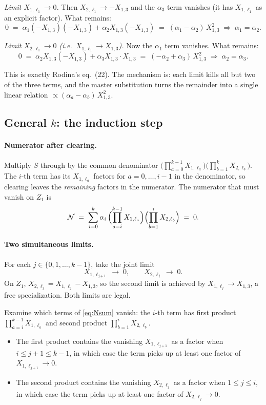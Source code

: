 \documentclass[11pt]{article}
\theoremstyle{definition}
\begin{document}
\smallskip
\noindent\emph{Limit $X_{1,\ell_1} \to 0$.} Then $X_{2,\ell_1} \to -X_{1,3}$ and the $\alpha_3$ term vanishes (it has $X_{1,\ell_1}$ as an explicit factor). What remains:
\[
0 \;=\; \alpha_1(-X_{1,3})(-X_{1,3}) + \alpha_2 X_{1,3}(-X_{1,3}) \;=\; (\alpha_1 - \alpha_2)\,X_{1,3}^2 \;\Longrightarrow\; \alpha_1 = \alpha_2.
\]

\smallskip
\noindent\emph{Limit $X_{2,\ell_1} \to 0$ (i.e.\ $X_{1,\ell_1} \to X_{1,3}$).} Now the $\alpha_1$ term vanishes. What remains:
\[
0 \;=\; \alpha_2 X_{1,3}(-X_{1,3}) + \alpha_3 X_{1,3}\cdot X_{1,3} \;=\; (-\alpha_2 + \alpha_3)\,X_{1,3}^2 \;\Longrightarrow\; \alpha_2 = \alpha_3.
\]

\noindent
This is exactly Rodina's eq.~(22). The mechanism is: each limit kills all but two of the three terms, and the master substitution turns the remainder into a single linear relation $\propto (\alpha_a - \alpha_b)\,X_{1,3}^2$.

\subsection{General $k$: the induction step}

\paragraph{Numerator after clearing.}
Multiply $S$ through by the common denominator $\bigl(\prod_{a=0}^{k-1} X_{1,\ell_a}\bigr)\bigl(\prod_{b=1}^{k} X_{2,\ell_b}\bigr)$. The $i$-th term has its $X_{1,\ell_a}$ factors for $a = 0, \dots, i-1$ in the denominator, so clearing leaves the \emph{remaining} factors in the numerator. The numerator that must vanish on $Z_1$ is
\begin{equation}\label{eq:Nsum}
\mathcal{N} \;=\; \sum_{i=0}^{k} \alpha_i \,\Bigl(\prod_{a=i}^{k-1} X_{1,\ell_a}\Bigr) \Bigl(\prod_{b=1}^{i} X_{2,\ell_b}\Bigr) \;=\; 0.
\end{equation}

\paragraph{Two simultaneous limits.}
For each $j \in \{0, 1, \dots, k-1\}$, take the joint limit
\[
X_{1,\ell_{j+1}} \;\to\; 0, \qquad X_{2,\ell_j} \;\to\; 0.
\]
On $Z_1$, $X_{2,\ell_j} = X_{1,\ell_j} - X_{1,3}$, so the second limit is achieved by $X_{1,\ell_j} \to X_{1,3}$, a free specialization. Both limits are legal.

Examine which terms of \eqref{eq:Nsum} vanish: the $i$-th term has first product $\prod_{a=i}^{k-1} X_{1,\ell_a}$ and second product $\prod_{b=1}^{i} X_{2,\ell_b}$.
\begin{itemize}
  \item The first product contains the vanishing $X_{1,\ell_{j+1}}$ as a factor when $i \leq j+1 \leq k-1$, in which case the term picks up at least one factor of $X_{1,\ell_{j+1}} \to 0$.
  \item The second product contains the vanishing $X_{2,\ell_j}$ as a factor when $1 \leq j \leq i$, in which case the term picks up at least one factor of $X_{2,\ell_j} \to 0$.
\end{itemize}
\end{document}
